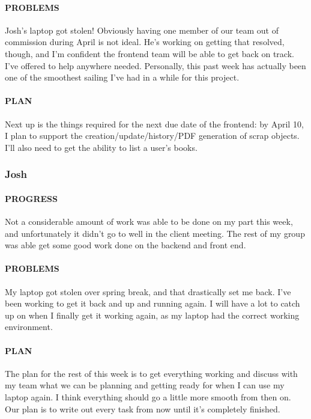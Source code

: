 \documentclass[onecolumn, draftclsnofoot,10pt, compsoc]{IEEEtran}
\begin{document}
	\paragraph{PROBLEMS}
	Josh's laptop got stolen! Obviously having one member of our team out of commission during April is not ideal. He's working on getting that resolved, though, and I'm confident the frontend team will be able to get back on track. I've offered to help anywhere needed. Personally, this past week has actually been one of the smoothest sailing I've had in a while for this project.
	
	\paragraph{PLAN}
	Next up is the things required for the next due date of the frontend: by April 10, I plan to support the creation/update/history/PDF generation of scrap objects. I'll also need to get the ability to list a user's books.
	
	\subsubsection{Josh}
	
	\paragraph{PROGRESS}
	Not a considerable amount of work was able to be done on my part this week, and unfortunately it didn't go to well in the client meeting. The rest of my group was able get some good work done on the backend and front end. 
	
	\paragraph{PROBLEMS}
	My laptop got stolen over spring break, and that drastically set me back. I've been working to get it back and up and running again. I will have a lot to catch up on when I finally get it working again, as my laptop had the correct working environment.
	
	\paragraph{PLAN}
	The plan for the rest of this week is to get everything working and discuss with my team what we can be planning and getting ready for when I can use my laptop again. I think everything should go a little more smooth from then on. Our plan is to write out every task from now until it's completely finished.
	
\end{document}

